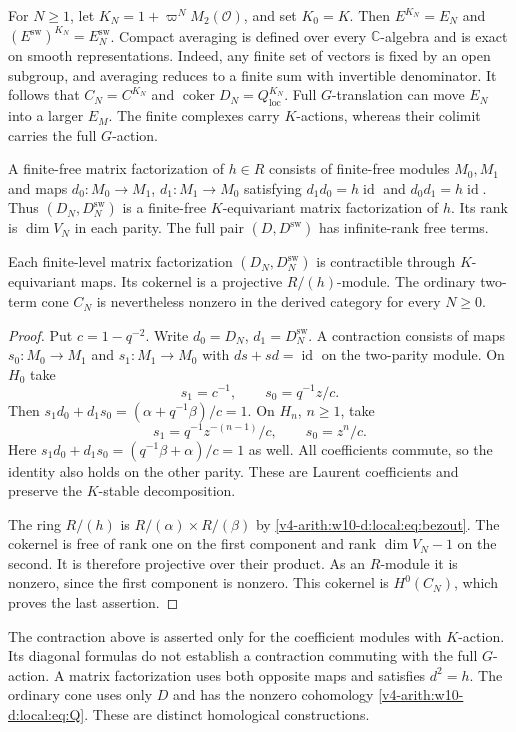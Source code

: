 For $N\ge1$, let $K_N=1+\varpi^NM_2(\mathcal O)$, and set $K_0=K$.
Then $E^{K_N}=E_N$ and $(E^\mathrm{sw})^{K_N}=E_N^\mathrm{sw}$.
Compact averaging is defined over every $\mathbb C$-algebra and is exact on smooth representations.
Indeed, any finite set of vectors is fixed by an open subgroup, and averaging reduces to a finite sum with invertible denominator.
It follows that $C_N=C^{K_N}$ and $\operatorname{coker} D_N=Q_{\mathrm{loc}}^{K_N}$.
Full $G$-translation can move $E_N$ into a larger $E_M$.
The finite complexes carry $K$-actions, whereas their colimit carries the full $G$-action.

A finite-free matrix factorization of $h\in R$ consists of finite-free modules $M_0,M_1$
and maps $d_0:M_0\to M_1$, $d_1:M_1\to M_0$ satisfying
$d_1d_0=h\operatorname{id}$ and $d_0d_1=h\operatorname{id}$.
Thus $(D_N,D_N^\mathrm{sw})$ is a finite-free $K$-equivariant matrix factorization of $h$.
Its rank is $\dim V_N$ in each parity.
The full pair $(D,D^\mathrm{sw})$ has infinite-rank free terms.

\begin{proposition}\label{v4-arith:w10-d:local:prop:mf}
Each finite-level matrix factorization $(D_N,D_N^\mathrm{sw})$ is contractible through $K$-equivariant maps.
Its cokernel is a projective $R/(h)$-module.
The ordinary two-term cone $C_N$ is nevertheless nonzero in the derived category for every $N\ge0$.
\end{proposition}
\begin{proof}
Put $c=1-q^{-2}$.
Write $d_0=D_N$, $d_1=D_N^\mathrm{sw}$.
A contraction consists of maps $s_0:M_0\to M_1$ and $s_1:M_1\to M_0$
with $ds+sd=\operatorname{id}$ on the two-parity module.
On $H_0$ take
\[
 s_1=c^{-1},\qquad s_0=q^{-1}z/c.
\]
Then $s_1d_0+d_1s_0=(\alpha+q^{-1}\beta)/c=1$.
On $H_n$, $n\ge1$, take
\[
 s_1=q^{-1}z^{-(n-1)}/c,\qquad s_0=z^n/c.
\]
Here $s_1d_0+d_1s_0=(q^{-1}\beta+\alpha)/c=1$ as well.
All coefficients commute, so the identity also holds on the other parity.
These are Laurent coefficients and preserve the $K$-stable decomposition.

The ring $R/(h)$ is $R/(\alpha)\times R/(\beta)$ by \eqref{v4-arith:w10-d:local:eq:bezout}.
The cokernel is free of rank one on the first component and rank $\dim V_N-1$ on the second.
It is therefore projective over their product.
As an $R$-module it is nonzero, since the first component is nonzero.
This cokernel is $H^0(C_N)$, which proves the last assertion.
\end{proof}

The contraction above is asserted only for the coefficient modules with $K$-action.
Its diagonal formulas do not establish a contraction commuting with the full $G$-action.
A matrix factorization uses both opposite maps and satisfies $d^2=h$.
The ordinary cone uses only $D$ and has the nonzero cohomology \eqref{v4-arith:w10-d:local:eq:Q}.
These are distinct homological constructions.

